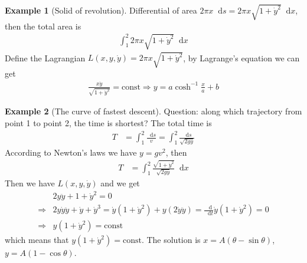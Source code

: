 \documentclass[twoside,9pt]{article}
\numberwithin{equation}{section} %
\newcommand{\lms}{\fontfamily{lmss}\selectfont} %
\renewcommand*\d{\mathop{}\!\mathrm{d}}
\theoremstyle{definition}
\newtheorem{example}{\lms Example}[section]
\theoremstyle{remark}
\begin{document}
\begin{example}[Solid of revolution]
Differential of area $2\pi x\d s = 2\pi x\sqrt{1+\dot{y}^2}\d x$,
then the total area is
\begin{align}
    \int_1^2 2\pi x\sqrt{1+\dot{y}^2}\d x
\end{align}
Define the Lagrangian $L(x, y, \dot{y}) = 2\pi x\sqrt{1+\dot{y}^2}$,
by Lagrange's equation we can get
\begin{align}
    \frac{x\dot{y}}{\sqrt{1+\dot{y}^2}} = \text{const}
    \Rightarrow y = a\cosh^{-1}\frac{x}{a} + b
\end{align}
\end{example}

\begin{example}[The curve of fastest descent]
Question: along which trajectory from point 1 to point 2,
the time is shortest?
The total time is
\begin{align}
    T &= \int_1^2
    \frac{\d s}{v}
    = \int_1^2\frac{\d s}{\sqrt{2gy}}
\end{align}
According to Newton's laws we have $y=gv^2$, then
\begin{align}
    T &= \int_1^2\frac{\sqrt{1+\dot{y}^2}}{\sqrt{2gy}}\d x
\end{align}
Then we have $L(x, y, \dot{y})$ and we get
\begin{align}
    &2y\ddot y + 1 + \dot y^2 = 0\\
    \Rightarrow
    &2y\dot y\ddot y + \dot y + \dot y^3 
    = \dot y(1 + \dot y^2) + y (2\dot y\ddot y)
    = \frac{\d}{\d t}\dot y(1 + \dot y^2) = 0\\
    \Rightarrow
    &y(1 + \dot y^2) = \text{const}
\end{align}
which means that $y(1+\dot{y}^2)=\text{const}$.
The solution is $x=A(\theta-\sin\theta)$, $y=A(1-\cos\theta)$.
\end{example}
\end{document}
